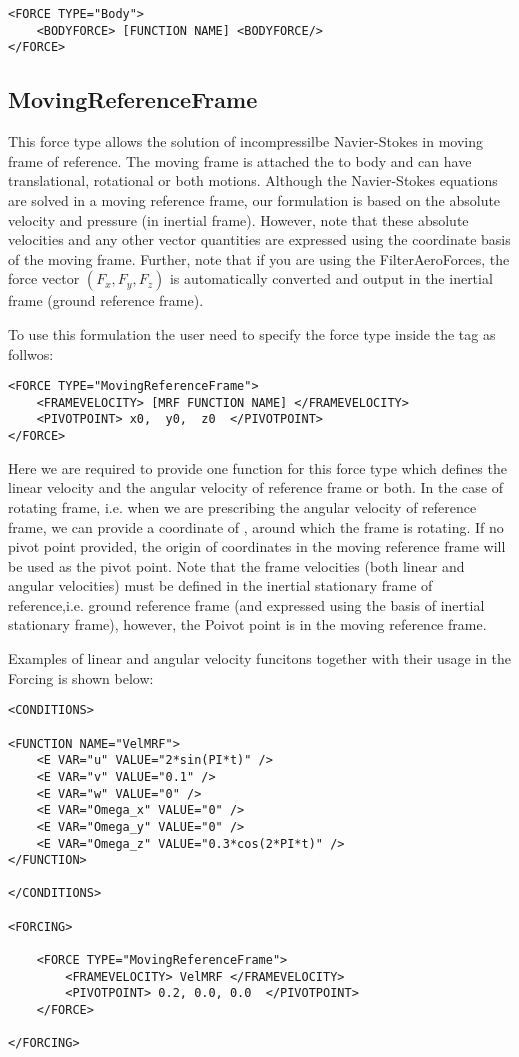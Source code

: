\begin{lstlisting}[style=XMLStyle] 
<FORCE TYPE="Body">
    <BODYFORCE> [FUNCTION NAME] <BODYFORCE/>
</FORCE>
\end{lstlisting}

\subsection{MovingReferenceFrame}
This force type allows the solution of incompressilbe Navier-Stokes in moving frame of reference. The moving frame is attached the to body and can have translational, rotational or both motions. Although the Navier-Stokes equations are solved in a moving reference frame, our formulation is based on the absolute velocity and pressure (in inertial frame). However, note that these absolute velocities and any other vector quantities are expressed using the coordinate basis of the moving frame. Further, note that if you are using the FilterAeroForces, the force vector $\left(F_x, F_y, F_z\right)$ is automatically converted and output in the inertial frame (ground reference frame).

To use this formulation the user need to specify the force type inside the  tag as follwos:

\begin{lstlisting}[style=XMLStyle]
<FORCE TYPE="MovingReferenceFrame">
    <FRAMEVELOCITY> [MRF FUNCTION NAME] </FRAMEVELOCITY>
    <PIVOTPOINT> x0,  y0,  z0  </PIVOTPOINT>
</FORCE>
\end{lstlisting}

Here we are required to provide one function for this force type which defines the linear velocity and the angular velocity of reference frame or both. In the case of rotating frame, i.e. when we are prescribing the angular velocity of reference frame, we can provide a coordinate of , around which the frame is rotating. If no pivot point provided, the origin of coordinates in the moving reference frame will be used as the pivot point.
Note that the frame velocities (both linear and angular velocities) must be defined in the inertial stationary frame of reference,i.e. ground reference frame (and expressed using the basis of inertial stationary frame), however, the Poivot point is in the moving reference frame.

Examples of linear and angular velocity funcitons together with their usage in the Forcing is shown below:

\begin{lstlisting}[style=XMLStyle]
<CONDITIONS>

<FUNCTION NAME="VelMRF">
    <E VAR="u" VALUE="2*sin(PI*t)" />
    <E VAR="v" VALUE="0.1" />
    <E VAR="w" VALUE="0" />
    <E VAR="Omega_x" VALUE="0" />
    <E VAR="Omega_y" VALUE="0" />
    <E VAR="Omega_z" VALUE="0.3*cos(2*PI*t)" />
</FUNCTION>

</CONDITIONS>

<FORCING>

    <FORCE TYPE="MovingReferenceFrame">
        <FRAMEVELOCITY> VelMRF </FRAMEVELOCITY>
        <PIVOTPOINT> 0.2, 0.0, 0.0  </PIVOTPOINT>
    </FORCE>

</FORCING>
\end{lstlisting}


